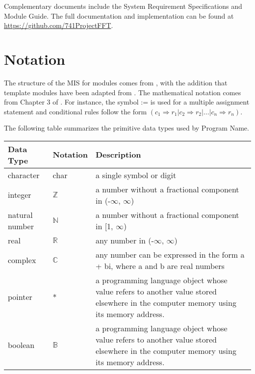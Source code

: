 \documentclass[12pt, titlepage]{article}
\newcommand{\progname}{Program Name}
\begin{document}

Complementary documents include the System Requirement Specifications
and Module Guide.  The full documentation and implementation can be
found at \url{https://github.com/741ProjectFFT}. 

\section{Notation}


The structure of the MIS for modules comes from \citet{HoffmanAndStrooper1995},
with the addition that template modules have been adapted from
\cite{GhezziEtAl2003}.  The mathematical notation comes from Chapter 3 of
\citet{HoffmanAndStrooper1995}.  For instance, the symbol := is used for a
multiple assignment statement and conditional rules follow the form $(c_1
\Rightarrow r_1 | c_2 \Rightarrow r_2 | ... | c_n \Rightarrow r_n )$.

The following table summarizes the primitive data types used by \progname. 

\begin{center}
\renewcommand{\arraystretch}{1.2}
\noindent 
\begin{tabular}{l l p{7.5cm}} 
\toprule 
\textbf{Data Type} & \textbf{Notation} & \textbf{Description}\\ 
\midrule
character & char & a single symbol or digit\\
integer & $\mathbb{Z}$ & a number without a fractional component in (-$\infty$, $\infty$) \\
natural number & $\mathbb{N}$ & a number without a fractional component in [1, $\infty$) \\
real & $\mathbb{R}$ & any number in (-$\infty$, $\infty$)\\
complex & $\mathbb{C}$ & any number can be expressed in the form a + bi, where a and b are real numbers\\
pointer & * & a programming language object whose value refers to another value stored elsewhere in the computer memory using its memory address.\\
boolean &$\mathbb{B}$  & a programming language object whose value refers to another value stored elsewhere in the computer memory using its memory address.\\
\bottomrule
\end{tabular} 
\end{center}
\end{document}
